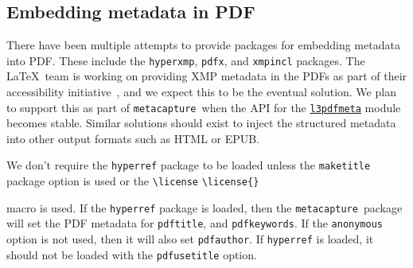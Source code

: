 \documentclass{article}
\newcommand{\pkgname}{\texttt{metacapture}}
\newcommand{\cmd}[2][]{%
  \def\FirstArg{#1}%
  \ifx\FirstArg\empty%
    \texttt{\textbackslash{}#2}%
  \else%
    \texttt{\textbackslash{}#2\{#1\}}%
  \fi
}
\newcommand{\pkg}[1]{\texttt{#1}}
\begin{document}
\subsection{Embedding metadata in PDF}\label{pdfmetadata}
There have been multiple attempts to provide packages for embedding
metadata into PDF. These include the \texttt{hyperxmp}, \texttt{pdfx},
and \texttt{xmpincl} packages.  The \LaTeX\ team is working on
providing XMP metadata in the PDFs as part of their accessibility
initiative~\cite{xmpinlatex}, and we expect this to be the eventual
solution.  We plan to support this as part of \pkgname\ when the API
for the
\href{https://ctan.math.washington.edu/tex-archive/macros/latex/contrib/pdfmanagement-testphase/l3pdfmeta.pdf}{\texttt{l3pdfmeta}} module becomes stable. Similar solutions should exist to inject the structured
metadata into other output formats such as HTML or EPUB.

We don't require the \pkg{hyperref} package to be loaded unless
the \texttt{maketitle} package option is used or the \cmd{license}
macro is used. If the \pkg{hyperref} package is loaded, then the
\pkgname\ package will set the PDF metadata for \texttt{pdftitle},
and \texttt{pdfkeywords}. If the \texttt{anonymous} option is not used, then
it will also set \texttt{pdfauthor}. If \pkg{hyperref} is loaded, it
should not be loaded with the \pkg{pdfusetitle} option.
\end{document}
